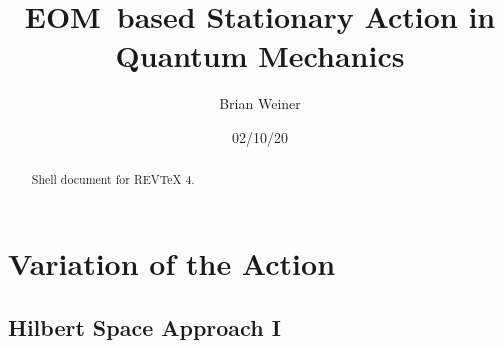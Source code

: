 \documentclass[aps,preprint]{revtex4}
\begin{document}
\title[QuantAct]{EOM\ based Stationary Action in Quantum Mechanics}
\author{Brian Weiner}

\begin{abstract}
Shell document for REV\TeX{} 4.
\end{abstract}

\date[Date text]{02/10/20}
\maketitle
\tableofcontents

\section{Variation of the Action}

\subsection{Hilbert Space Approach I}
\end{document}
